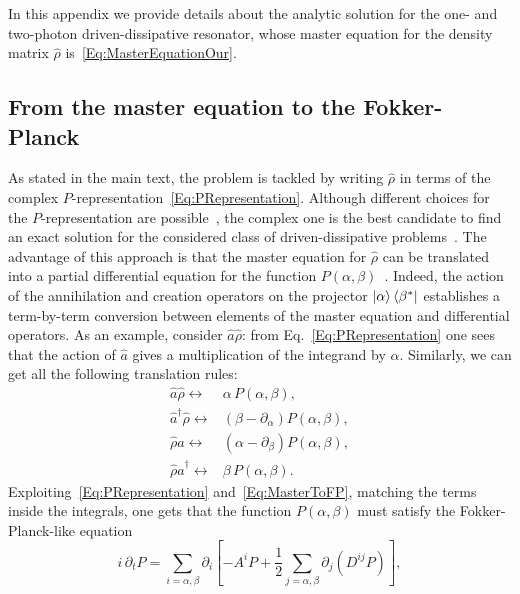 In this appendix we provide details about the analytic solution for the one- and two-photon driven-dissipative resonator, whose master equation for the density matrix $\hat{\rho}$ is~\eqref{Eq:MasterEquationOur}.

\subsection{From the master equation to the Fokker-Planck}\label{subsec:solFP}

As stated in the main text, the problem is tackled by writing $\hat{\rho}$ in terms of the complex $P$-representation~\eqref{Eq:PRepresentation}.
Although different choices for the $P$-representation are possible~\cite{DrummondJPA80b}, the complex one is the best candidate to find an exact solution for the considered class of driven-dissipative problems~\cite{DrummondJPA80a}.
The advantage of this approach is that the master equation for $\hat{\rho}$ can be translated into a partial differential equation for the function $P(\alpha,\beta)$~\cite{DrummondJPA80b,WallsBOOK}.
Indeed, the action of the annihilation and creation operators on the projector $\ket{\alpha}\bra{\beta^*}$ establishes a term-by-term conversion between elements of the master equation and differential operators.
As an example, consider ${\hat{a}}\hat{\rho}$: from Eq.~\eqref{Eq:PRepresentation} one sees that the action of ${\hat{a}}$ gives a multiplication of the integrand by $\alpha$.
Similarly, we can get all the following translation rules:
\begin{subequations}\label{Eq:MasterToFP}
	\begin{align}
	{\hat{a}}\hat{\rho}\leftrightarrow&
	\alpha\, P(\alpha,\beta),
	\\
	{\hat{a}^\dagger}\hat{\rho}\leftrightarrow&
	\left(\beta-\partial_\alpha\right) P(\alpha,\beta),
	\\
	\hat{\rho}{\hat{a}}\leftrightarrow&
	\left(\alpha-\partial_\beta\right) P(\alpha,\beta),
	\\
	\hat{\rho}{\hat{a}^\dagger}\leftrightarrow&
	\beta\, P(\alpha,\beta).
	\end{align}
\end{subequations}
Exploiting~\eqref{Eq:PRepresentation} and~\eqref{Eq:MasterToFP}, matching the terms inside the integrals, one gets that the function $P(\alpha,\beta)$ must satisfy the Fokker-Planck-like equation
\begin{equation}\label{Eq:FokkerPlanck}
 i \,\partial_t P=
\sum_{i=\alpha,\beta} \partial_i \left[-A^i P
+ \frac{1}{2} \sum_{j=\alpha,\beta} \partial_j \left(D^{ij} P \right)  \right],
\end{equation}
